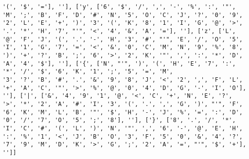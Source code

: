 \documentclass{article}
\begin{document}
\begin{verbatim}
'(', '$', '='], ''], ['y', ['6', '$', '/', ',', '-', '%', ':', '"', 'M', ';', 'B', 'F', 'D', '#', 'N', '5', 'O', 'C', 'J', '?', '0', '9', '2', 'L', 'E', '+', ')', '3', '(', 'K', '8', '1', 'I', 'G', '@', '>', '.', '*', 'H', '7', "'", '<', '4', '&', 'A', '='], ''], ['z', ['L', '@', 'F', 'J', '(', '.', '-', 'H', '3', '#', "'", 'E', '/', 'O', '5', 'I', '1', 'G', '7', '=', '<', '&', '0', 'C', 'M', 'N', '9', '%', '8', ')', '+', '?', 'B', ';', '6', '>', '2', 'K', '"', ',', ':', '*', 'D', 'A', '4', '$'], ''], ['{', ['N', "'", ')', '(', 'H', 'E', '7', ':', '*', '/', '$', '6', 'K', '1', ';', '5', '=', 'M', 
'3', '?', 'B', '#', '.', '&', '9', '8', 'J', '<', '2', ',', 'F', 'L', '+', 'A', 'C', '"', '>', '%', '@', '0', '4', 'D', 'G', '-', 'I', 'O'], ''], ['|', ['&', '4', '9', '1', '@', '<', 'C', '+', 'N', 'E', '?', '>', '*', '2', 'A', '#', 'I', '3', '(', '.', ',', 'G', ')', "'", 'F', '6', 'K', 'M', 'L', 'B', '"', '$', 'H', '-', 'J', '%', '=', ':', 'D', '0', '/', '7', 'O', '5', ';', '8'], ''], ['}', ['8', '.', '/', '*', 'I', 'C', '#', '(', 'L', ')', 'N', '"', ',', '6', '-', '@', 'E', 'H', ':', '%', '1', '<', 'J', 'B', 'O', '3', 'F', '5', '0', '&', '4', '?', '7', '9', 'M', 'D', 'K', '>', 'G', ';', '2', 'A', '=', "'", '$', '+'], '']]
\end{verbatim}
\end{document}
